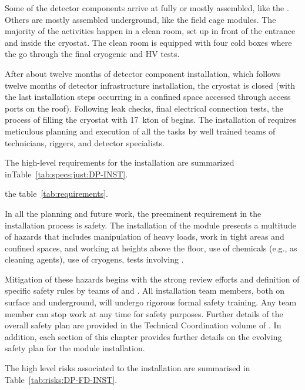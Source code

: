 Some of the detector components arrive at  fully or mostly assembled, like the .
Others are mostly assembled underground, like the field cage modules.
The majority of the activities happen in a clean room, set up in front of the  entrance and inside the cryostat.
The clean room is equipped with four cold boxes where the  go through the final cryogenic and HV tests.

After about twelve months of detector component installation, which follows twelve months of detector infrastructure installation, the cryostat is closed (with the last installation steps occurring in a confined space accessed through access ports on the roof). %
Following leak checks, final electrical connection tests, the process of filling the cryostat with 17~kton of  begins.
The installation of  requires meticulous planning and execution of all the tasks by well trained teams of technicians, riggers, and detector specialists.

The high-level requirements for the  installation are summarized inTable~\ref{tab:specs:just:DP-INST}. 

the table~\ref{tab:requirements}.


In all the planning and future work, the preeminent requirement in the installation process is safety.
The installation of the  module presents a multitude of hazards that includes manipulation of heavy loads, work in tight areas and confined spaces, and working at heights above the floor, use of chemicals (e.g., as cleaning agents), use of cryogens, tests involving .

Mitigation of these hazards begins with the strong review efforts and definition of specific safety rules by  teams of  and .
All installation team members, both on surface and underground, will undergo rigorous formal safety training.
Any team member can stop work at any time for safety purposes.
Further details of the overall  safety plan are provided in the Technical Coordination volume of .
In addition, each section of this chapter provides further details on the evolving safety plan for the  module installation.


The high level risks associated to the  installation are summarised in Table~\ref{tab:risks:DP-FD-INST}.




